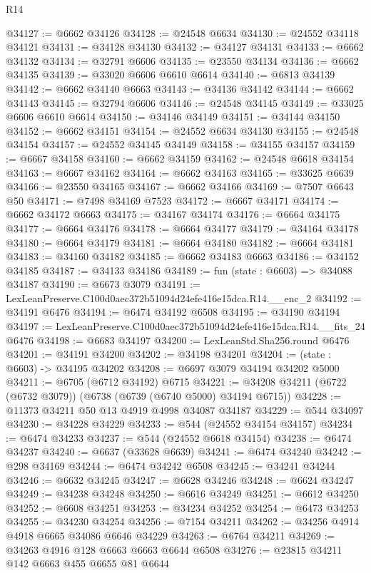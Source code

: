 \begin{lexlean}{R14}
\begin{coremodule}
@34127 := @6662 @34126
@34128 := @24548 @6634
@34130 := @24552 @34118 @34121
@34131 := @34128 @34130
@34132 := @34127 @34131
@34133 := @6662 @34132
@34134 := @32791 @6606
@34135 := @23550 @34134
@34136 := @6662 @34135
@34139 := @33020 @6606 @6610 @6614
@34140 := @6813 @34139
@34142 := @6662 @34140 @6663
@34143 := @34136 @34142
@34144 := @6662 @34143
@34145 := @32794 @6606
@34146 := @24548 @34145
@34149 := @33025 @6606 @6610 @6614
@34150 := @34146 @34149
@34151 := @34144 @34150
@34152 := @6662 @34151
@34154 := @24552 @6634 @34130
@34155 := @24548 @34154
@34157 := @24552 @34145 @34149
@34158 := @34155 @34157
@34159 := @6667 @34158
@34160 := @6662 @34159
@34162 := @24548 @6618 @34154
@34163 := @6667 @34162
@34164 := @6662 @34163
@34165 := @33625 @6639
@34166 := @23550 @34165
@34167 := @6662 @34166
@34169 := @7507 @6643 @50
@34171 := @7498 @34169 @7523
@34172 := @6667 @34171
@34174 := @6662 @34172 @6663
@34175 := @34167 @34174
@34176 := @6664 @34175
@34177 := @6664 @34176
@34178 := @6664 @34177
@34179 := @34164 @34178
@34180 := @6664 @34179
@34181 := @6664 @34180
@34182 := @6664 @34181
@34183 := @34160 @34182
@34185 := @6662 @34183 @6663
@34186 := @34152 @34185
@34187 := @34133 @34186
@34189 := fun (state : @6603) => @34088 @34187
@34190 := @6673 @3079
@34191 := LexLeanPreserve.C100d0aec372b51094d24efe416e15dca.R14.__enc_2
@34192 := @34191 @6476
@34194 := @6474 @34192 @6508
@34195 := @34190 @34194
@34197 := LexLeanPreserve.C100d0aec372b51094d24efe416e15dca.R14.__fits_24 @6476
@34198 := @6683 @34197
@34200 := LexLeanStd.Sha256.round @6476
@34201 := @34191 @34200
@34202 := @34198 @34201
@34204 := (state : @6603) -> @34195 @34202
@34208 := @6697 @3079 @34194 @34202 @5000
@34211 := @6705 (@6712 @34192) @6715
@34221 := @34208 @34211 (@6722 (@6732 @3079)) (@6738 (@6739 (@6740 @5000) @34194 @6715))
@34228 := @11373 @34211 @50 @13 @4919 @4998 @34087 @34187
@34229 := @544 @34097
@34230 := @34228 @34229
@34233 := @544 (@24552 @34154 @34157)
@34234 := @6474 @34233
@34237 := @544 (@24552 @6618 @34154)
@34238 := @6474 @34237
@34240 := @6637 (@33628 @6639)
@34241 := @6474 @34240
@34242 := @298 @34169
@34244 := @6474 @34242 @6508
@34245 := @34241 @34244
@34246 := @6632 @34245
@34247 := @6628 @34246
@34248 := @6624 @34247
@34249 := @34238 @34248
@34250 := @6616 @34249
@34251 := @6612 @34250
@34252 := @6608 @34251
@34253 := @34234 @34252
@34254 := @6473 @34253
@34255 := @34230 @34254
@34256 := @7154 @34211
@34262 := @34256 @4914 @4918 @6665 @34086 @6646 @34229
@34263 := @6764 @34211
@34269 := @34263 @4916 @128 @6663 @6663 @6644 @6508
@34276 := @23815 @34211 @142 @6663 @455 @6655 @81 @6644

\end{coremodule}
\end{lexlean}
